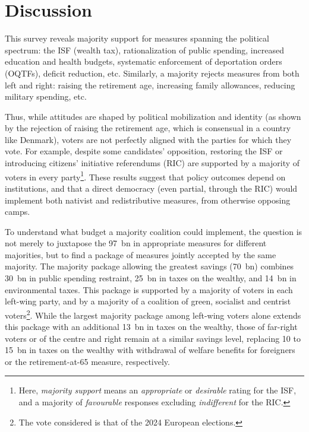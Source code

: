 \documentclass[12pt,english]{article}
\newcommand{\blue}[1]{\textcolor{blue!60!black}{#1}}
\begin{document}
\section{Discussion}
\label{sec:conclusion}

This survey reveals majority support for measures spanning the political spectrum: the ISF (wealth tax), rationalization of public spending, increased education and health budgets, systematic enforcement of deportation orders (OQTFs), deficit reduction, etc. Similarly, a majority rejects measures from both left and right: raising the retirement age, increasing family allowances, reducing military spending, etc.

Thus, while attitudes are shaped by political mobilization and identity (as shown by the rejection of raising the retirement age, which is consensual in a country like Denmark), voters are not perfectly aligned with the parties for which they vote. For example, despite some candidates' opposition, \blue{restoring the ISF or introducing citizens' initiative referendums (RIC) are supported by a majority of voters in every party}\footnote{Here, \textit{majority support} means an \textit{appropriate} or \textit{desirable} rating for the ISF, and a majority of \textit{favourable} responses excluding \textit{indifferent} for the RIC.}. These results suggest that policy outcomes depend on institutions, and that a direct democracy (even partial, through the RIC) would implement both nativist and redistributive measures, from otherwise opposing camps.

To understand what budget a majority coalition could implement, the question is not merely to juxtapose the 97~bn in appropriate measures for different majorities, but to find a package of measures jointly accepted by the same majority. \blue{The majority package allowing the greatest savings (70~bn) combines 30~bn in public spending restraint, 25~bn in taxes on the wealthy, and 14~bn in environmental taxes}. This package is supported by a majority of voters in each left-wing party, and by a majority of a coalition of green, socialist and centrist voters\footnote{The vote considered is that of the 2024 European elections.}. While the largest majority package among left-wing voters alone extends this package with an additional 13~bn in taxes on the wealthy, those of far-right voters or of the centre and right remain at a similar savings level, replacing 10 to 15~bn in taxes on the wealthy with withdrawal of welfare benefits for foreigners or the retirement-at-65 measure, respectively.
\end{document}
